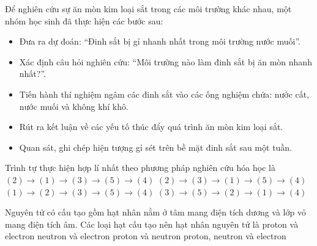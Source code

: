 \begin{ex}
    Để nghiên cứu sự ăn mòn kim loại sắt trong các môi trường khác nhau, một nhóm học sinh đã thực hiện các bước sau:
    \begin{itemize}
        \item[(1)] Đưa ra dự đoán: ``Đinh sắt bị gỉ nhanh nhất trong môi trường nước muối''.
        \item[(2)] Xác định câu hỏi nghiên cứu: ``Môi trường nào làm đinh sắt bị ăn mòn nhanh nhất?''.
        \item[(3)] Tiến hành thí nghiệm ngâm các đinh sắt vào các ống nghiệm chứa: nước cất, nước muối và không khí khô.
        \item[(4)] Rút ra kết luận về các yếu tố thúc đẩy quá trình ăn mòn kim loại sắt.
        \item[(5)] Quan sát, ghi chép hiện tượng gỉ sét trên bề mặt đinh sắt sau một tuần.
    \end{itemize}
    Trình tự thực hiện hợp lí nhất theo phương pháp nghiên cứu hóa học là
    \choice
    {\True $(2) \rightarrow (1) \rightarrow (3) \rightarrow (5) \rightarrow (4)$}
    {$(2) \rightarrow (3) \rightarrow (1) \rightarrow (5) \rightarrow (4)$}
    {$(1) \rightarrow (2) \rightarrow (3) \rightarrow (5) \rightarrow (4)$}
    {$(3) \rightarrow (5) \rightarrow (2) \rightarrow (1) \rightarrow (4)$}
\end{ex}

\begin{ex}
    Nguyên tử có cấu tạo gồm hạt nhân nằm ở tâm mang điện tích dương và lớp vỏ mang điện tích âm. Các loại hạt cấu tạo nên hạt nhân nguyên tử là
    \choice
    {proton và electron}
    {neutron và electron}
    {\True proton và neutron}
    {proton, neutron và electron}
\end{ex}

